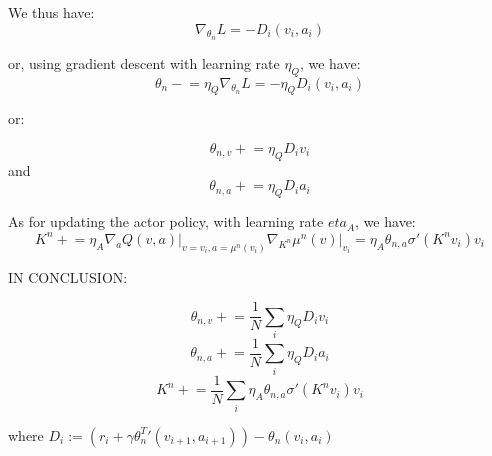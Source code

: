 We thus have:
$$\nabla_{\theta_n} L = -D_i (v_{i}, a_{i})$$

or, using gradient descent with learning rate $\eta_Q$, we have:
$$\theta_n \mathrel{-}= \eta_Q \nabla_{\theta_n} L = -\eta_Q D_i (v_{i}, a_{i})$$

or:

$$\theta_{n,v} \mathrel{+}= \eta_Q D_i v_i$$
and
$$\theta_{n,a} \mathrel{+}= \eta_Q D_i a_i$$

As for updating the actor policy, with learning rate $eta_A$, we have:
$$K^n \mathrel{+}= \eta_A \nabla_a Q(v, a) \vert_{v=v_i, a=\mu^n(v_i)} \nabla_{K^n} \mu^n(v) \vert_{v_i} = \eta_A \theta_{n,a} \sigma'(K^n v_i) v_i$$

IN CONCLUSION:

$$\theta_{n,v} \mathrel{+}= \frac{1}{N} \sum_i \eta_Q D_i v_i$$
$$\theta_{n,a} \mathrel{+}= \frac{1}{N} \sum_i \eta_Q D_i a_i$$
$$K^n \mathrel{+}= \frac{1}{N} \sum_i \eta_A \theta_{n,a} \sigma'(K^n v_i) v_i$$

where $D_i := (r_i + \gamma \theta_n^T' (v_{i+1}, a_{i+1})) - \theta_n (v_{i}, a_{i}) $
